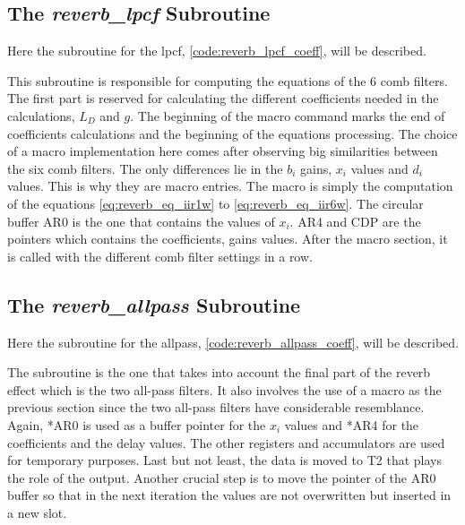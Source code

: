 \subsection{The \textit{reverb_lpcf} Subroutine}
Here the subroutine for the \gls{lpcf}, \autoref{code:reverb_lpcf_coeff}, will be described.


This subroutine is responsible for computing the equations of the 6 comb filters. The first part is reserved for calculating the different coefficients needed in the calculations, $L_D$ and $g$. The beginning of the macro command marks the end of coefficients calculations and the beginning of the equations processing. The choice of a macro implementation here comes after observing big similarities between the six comb filters. The only differences lie in the $b_{i}$ gains, $x_{i}$ values and $d_{i}$ values. This is why they are macro entries. The macro is simply the computation of the equations \ref{eq:reverb_eq_iir1w} to \ref{eq:reverb_eq_iir6w}. The circular buffer AR0 is the one that contains the values of $x_{i}$. AR4 and CDP are the pointers which contains the coefficients, gains values.
After the macro section, it is called with the different comb filter settings in a row. 

\subsection{The \textit{reverb_allpass} Subroutine} \label{imp:reverb_allpass}
Here the subroutine for the allpass, \autoref{code:reverb_allpass_coeff}, will be described.

The subroutine is the one that takes into account the final part of the \gls{reverb} effect which is the two all-pass filters. It also involves the use of a macro as the previous section since the two all-pass filters have considerable resemblance. Again, *AR0 is used as a buffer pointer for the $x_{i}$ values and *AR4 for the coefficients and the delay values. The other registers and accumulators are used for temporary purposes.
Last but not least, the data is moved to T2 that plays the role of the output. 
Another crucial step is to move the pointer of the AR0 buffer so that in the next iteration the values are not overwritten but inserted in a new slot.

